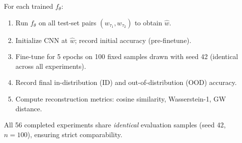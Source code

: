 For each trained $f_\theta$:
\begin{enumerate}
    \item Run $f_\theta$ on all test-set pairs $(w_{\tau_1}, w_{\tau_2})$ to obtain $\hat{w}$.
    \item Initialize CNN at $\hat{w}$; record initial accuracy (pre-finetune).
    \item Fine-tune for 5 epochs on 100 fixed samples drawn with seed 42 (identical across all experiments).
    \item Record final in-distribution (ID) and out-of-distribution (OOD) accuracy.
    \item Compute reconstruction metrics: cosine similarity, Wasserstein-1, GW distance.
\end{enumerate}

All 56 completed experiments share \emph{identical} evaluation samples (seed 42, $n=100$), ensuring strict comparability.
